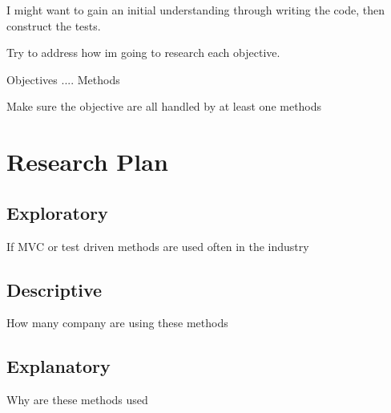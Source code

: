 I might want to gain an initial understanding through writing the code, then
construct the tests.

Try to address how im going to research each objective.

Objectives     ....     Methods

Make sure the objective are all handled by at least one methods


\section{Research Plan}

\subsection{Exploratory}
If MVC or test driven methods are used often in the industry

\subsection{Descriptive}
How many company are using these methods

\subsection{Explanatory}
Why are these methods used


